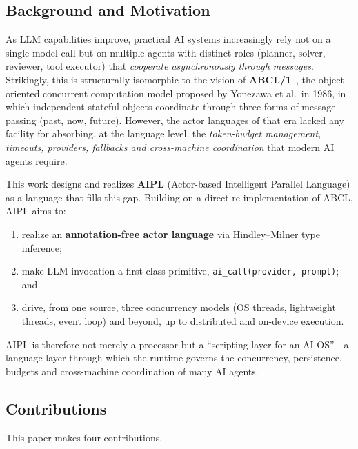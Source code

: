 \documentclass[11pt,a4paper]{article}
\newcommand{\code}[1]{\texttt{\small #1}}
\begin{document}
\subsection{Background and Motivation}

As LLM capabilities improve, practical AI systems increasingly rely not
on a single model call but on multiple agents with distinct roles
(planner, solver, reviewer, tool executor) that \emph{cooperate
asynchronously through messages}. Strikingly, this is structurally
isomorphic to the vision of \textbf{ABCL/1}~\cite{abcl1}, the
object-oriented concurrent computation model proposed by Yonezawa et
al.\ in 1986, in which independent stateful objects coordinate through
three forms of message passing (past, now, future).
However, the actor languages of that era lacked any facility for
absorbing, at the language level, the \emph{token-budget management,
timeouts, providers, fallbacks and cross-machine coordination} that
modern AI agents require.

This work designs and realizes \textbf{AIPL} (Actor-based Intelligent
Parallel Language) as a language that fills this gap.
Building on a direct re-implementation of ABCL, AIPL aims to:
\begin{enumerate}[leftmargin=1.6em,itemsep=2pt]
  \item realize an \textbf{annotation-free actor language} via
        Hindley--Milner type inference;
  \item make LLM invocation a first-class primitive,
        \code{ai\_call(provider, prompt)}; and
  \item drive, from one source, three concurrency models
        (OS threads, lightweight threads, event loop) and beyond,
        up to distributed and on-device execution.
\end{enumerate}
AIPL is therefore not merely a processor but a ``scripting layer for an
AI-OS''---a language layer through which the runtime governs the
concurrency, persistence, budgets and cross-machine coordination of
many AI agents.

\subsection{Contributions}

This paper makes four contributions.
\end{document}
